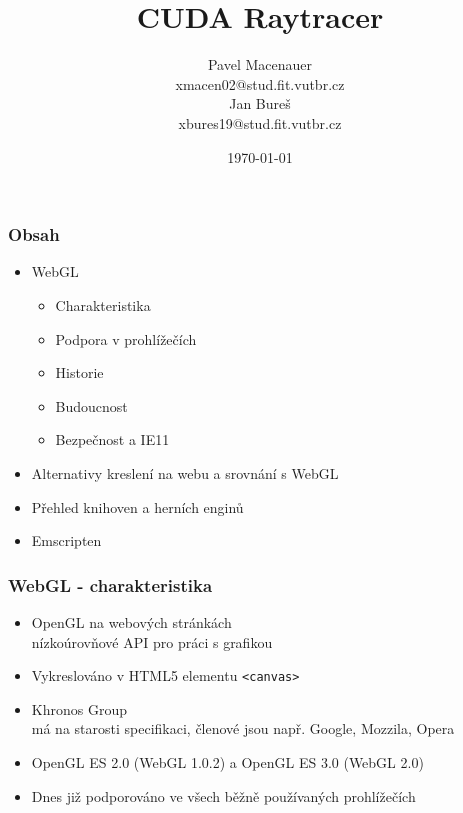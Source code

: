 \documentclass{beamer}
\title{\textbf{CUDA Raytracer}}
\author{
	\large{Pavel Macenauer} \\ 
	\tiny{xmacen02@stud.fit.vutbr.cz} \\ 
	\large{Jan Bureš} \\ 
	\tiny{xbures19@stud.fit.vutbr.cz}
}
\date{\tiny{\today}}
\institute[FIT VUTBR]
{
	\inst{}
	Fakulta Informačních Technologií \\
	Vysoké Učení Technické v Brně
}
\begin{document}
	\begin{frame}[t,plain]
	\titlepage
	\tableofcontents[currentsection]
	\vspace{-10mm}
	\end{frame}


	\begin{frame}[t,fragile]
		\frametitle{Obsah}	
		
		\begin{itemize}
			\item WebGL
			\begin{itemize}
				\item Charakteristika
				\item Podpora v prohlížečích
				\item Historie
				\item Budoucnost
				\item Bezpečnost a IE11				
			\end{itemize}
			\item Alternativy kreslení na webu a srovnání s WebGL
			\item Přehled knihoven a herních enginů
			\item Emscripten
		\end{itemize}			
				
	\end{frame}
	


	{
\begin{frame}[plain]
\end{frame}
}
	
	
	\begin{frame}[t,fragile]
		\frametitle{WebGL - charakteristika}
		
		\begin{itemize}
			\item OpenGL na webových stránkách \\
				\footnotesize{nízkoúrovňové API pro práci s grafikou}
			\item \large{Vykreslováno v HTML5 elementu} \verb|<canvas>|
			\item \large{Khronos Group} \\
				\footnotesize{má na starosti specifikaci, členové jsou např. Google, Mozzila, Opera}
			\item \large{OpenGL ES 2.0 (WebGL 1.0.2) a OpenGL ES 3.0 (WebGL 2.0)}
			\item Dnes již podporováno ve všech běžně používaných prohlížečích
		\end{itemize}		
		
	\end{frame}
\end{document}
